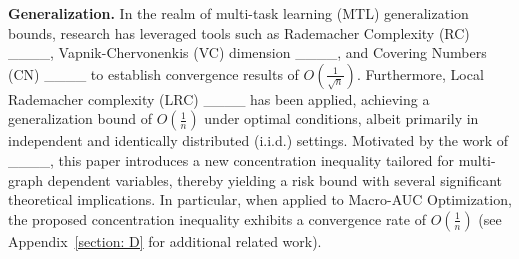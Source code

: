 \textbf{Generalization.} In the realm of multi-task learning (MTL) generalization bounds, research has leveraged tools such as Rademacher Complexity (RC) ____, Vapnik-Chervonenkis (VC) dimension ____, and Covering Numbers (CN) ____ to establish convergence results of $O(\frac{1}{\sqrt{n}})$. Furthermore, Local Rademacher complexity (LRC) ____ has been applied, achieving a generalization bound of $O(\frac{1}{n})$ under optimal conditions, albeit primarily in independent and identically distributed (i.i.d.) settings. Motivated by the work of ____, this paper introduces a new concentration inequality tailored for multi-graph dependent variables, thereby yielding a risk bound with several significant theoretical implications. In particular, when applied to Macro-AUC Optimization, the proposed concentration inequality exhibits a convergence rate of $O(\frac{1}{n})$ (see Appendix~\ref{section: D} for additional related work).











